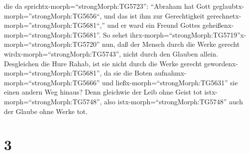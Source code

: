 die da sprichtx-morph=``strongMorph:TG5723'': ``Abraham hat Gott
geglaubtx-morph=''strongMorph:TG5656``, und das ist ihm zur
Gerechtigkeit gerechnetx-morph=''strongMorph:TG5681``,'' und er ward ein
Freund Gottes geheißenx-morph=``strongMorph:TG5681''.  So
sehet
ihrx-morph=``strongMorph:TG5719''\textbar x-morph=``strongMorph:TG5720''
nun, daß der Mensch durch die Werke gerecht
wirdx-morph=``strongMorph:TG5743'', nicht durch den Glauben allein.
 Desgleichen die Hure Rahab, ist sie nicht durch die Werke
gerecht gewordenx-morph=``strongMorph:TG5681'', da sie die Boten
aufnahmx-morph=``strongMorph:TG5666'' und
ließx-morph=``strongMorph:TG5631'' sie einen andern Weg hinaus?
 Denn gleichwie der Leib ohne Geist tot
istx-morph=``strongMorph:TG5748'', also
istx-morph=``strongMorph:TG5748'' auch der Glaube ohne Werke tot.

\hypertarget{section-2}{%
\section{3}\label{section-2}}

